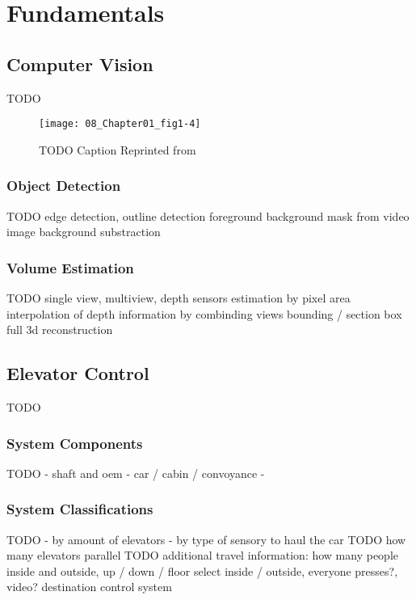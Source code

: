 \chapter{Fundamentals}
\label{chap:sota}

\section{Computer Vision}

TODO

\begin{figure}
	\centering
	\texttt{[image: 08\_Chapter01\_fig1-4]}
	\caption[]{\label{fig:sota:imageengineering} TODO Caption
	Reprinted from \textcite[][Chapter~1]{zhang2017imageprocessing}}
\end{figure}

\subsection{Object Detection}

TODO
edge detection, outline detection
foreground background mask from video image
background substraction

\subsection{Volume Estimation}

TODO
single view, multiview, depth sensors
estimation by pixel area
interpolation of depth information by combinding views
bounding / section box
full 3d reconstruction

\section{Elevator Control}
TODO

\subsection{System Components}
TODO
- shaft and oem
- car / cabin / convoyance
- 

\subsection{System Classifications}
TODO
- by amount of elevators
- by type of sensory to haul the car
TODO how many elevators parallel
TODO additional travel information: how many people inside and outside, up / down / floor select inside / outside, everyone presses?, video? 
destination control system

